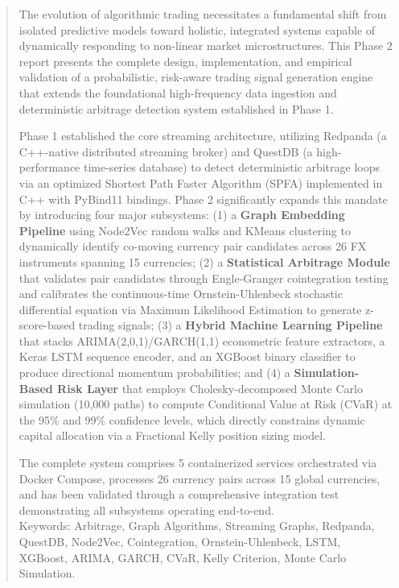 \documentclass[letterpaper,11pt]{report}
\begin{document}
\begin{abstract}
The evolution of algorithmic trading necessitates a fundamental shift from isolated predictive models toward holistic, integrated systems capable of dynamically responding to non-linear market microstructures. This Phase 2 report presents the complete design, implementation, and empirical validation of a probabilistic, risk-aware trading signal generation engine that extends the foundational high-frequency data ingestion and deterministic arbitrage detection system established in Phase 1.

Phase 1 established the core streaming architecture, utilizing Redpanda (a C++-native distributed streaming broker) and QuestDB (a high-performance time-series database) to detect deterministic arbitrage loops via an optimized Shortest Path Faster Algorithm (SPFA) implemented in C++ with PyBind11 bindings. Phase 2 significantly expands this mandate by introducing four major subsystems: (1) a \textbf{Graph Embedding Pipeline} using Node2Vec random walks and KMeans clustering to dynamically identify co-moving currency pair candidates across 26 FX instruments spanning 15 currencies; (2) a \textbf{Statistical Arbitrage Module} that validates pair candidates through Engle-Granger cointegration testing and calibrates the continuous-time Ornstein-Uhlenbeck stochastic differential equation via Maximum Likelihood Estimation to generate z-score-based trading signals; (3) a \textbf{Hybrid Machine Learning Pipeline} that stacks ARIMA(2,0,1)/GARCH(1,1) econometric feature extractors, a Keras LSTM sequence encoder, and an XGBoost binary classifier to produce directional momentum probabilities; and (4) a \textbf{Simulation-Based Risk Layer} that employs Cholesky-decomposed Monte Carlo simulation (10,000 paths) to compute Conditional Value at Risk (CVaR) at the 95\% and 99\% confidence levels, which directly constrains dynamic capital allocation via a Fractional Kelly position sizing model.

The complete system comprises 5 containerized services orchestrated via Docker Compose, processes 26 currency pairs across 15 global currencies, and has been validated through a comprehensive integration test demonstrating all subsystems operating end-to-end.
\\

\vspace{2in}
Keywords: Arbitrage, Graph Algorithms, Streaming Graphs, Redpanda, QuestDB, Node2Vec, Cointegration, Ornstein-Uhlenbeck, LSTM, XGBoost, ARIMA, GARCH, CVaR, Kelly Criterion, Monte Carlo Simulation.
\end{abstract}
\end{document}
